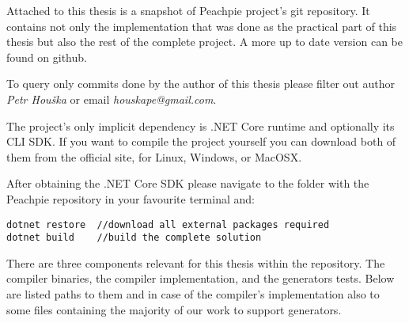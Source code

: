 
Attached to this thesis is a snapshot of Peachpie project’s git repository. It contains not only the implementation that was done as the practical part of this thesis but also the rest of the complete project. A more up to date version can be found on github\footnotemark.

To query only commits done by the author of this thesis please filter out author \emph{Petr Houška} or email \emph{houskape@gmail.com}.


The project’s only implicit dependency is .NET Core runtime and optionally its CLI SDK. If you want to compile the project yourself you can download both of them from the official site\footnotemark, for Linux, Windows, or MacOSX.

After obtaining the .NET Core SDK please navigate to the folder with the Peachpie repository in your favourite terminal and:

\begin{verbatim}
dotnet restore  //download all external packages required
dotnet build    //build the complete solution
\end{verbatim}


There are three components relevant for this thesis within the repository. The compiler binaries, the compiler implementation, and the generators tests. Below are listed paths to them and in case of the compiler’s implementation also to some files containing the majority of our work to support generators.

